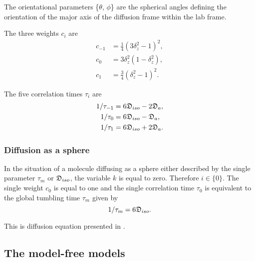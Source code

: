 \begin{htmlonly}
\begin{htmlonly}
\noindent The orientational parameters \{$\theta$, $\phi$\} are the spherical angles defining the orientation of the major axis of the diffusion frame within the lab frame.


The three weights $c_i$ are
\begin{subequations}
\begin{align}
    c_{-1} &= \tfrac{1}{4}(3\delta_z^2 - 1)^2, \label{eq: spheroid c-1} \\
    c_{0}  &= 3\delta_z^2(1 - \delta_z^2),     \label{eq: spheroid c0} \\
    c_{1}  &= \tfrac{3}{4}(\delta_z^2 - 1)^2.  \label{eq: spheroid c1}
\end{align}
\end{subequations}

The five correlation times $\tau_i$ are
\begin{subequations}
\begin{align}
    1/\tau_{-1} &= 6\mathfrak{D}_{iso} - 2\mathfrak{D}_a,    \label{eq: spheroid tau-1} \\
    1/\tau_{0}  &= 6\mathfrak{D}_{iso} - \mathfrak{D}_a,     \label{eq: spheroid tau0} \\
    1/\tau_{1}  &= 6\mathfrak{D}_{iso} + 2\mathfrak{D}_a.    \label{eq: spheroid tau1}
\end{align}
\end{subequations}



\subsubsection{Diffusion as a sphere}

In the situation of a molecule diffusing as a sphere either described by the single parameter $\tau_m$ or $\mathfrak{D}_{iso}$, the variable $k$ is equal to zero.  Therefore $i \in \{0\}$.  The single weight $c_0$ is equal to one and the single correlation time $\tau_0$ is equivalent to the global tumbling time $\tau_m$ given by
\begin{equation} \label{eq: sphere tau0}
    1/\tau_m = 6\mathfrak{D}_{iso}.
\end{equation}

\noindent This is diffusion equation presented in \citet{Bloembergen48}.



\subsection{The model-free models}


\end{htmlonly}
\end{htmlonly}
